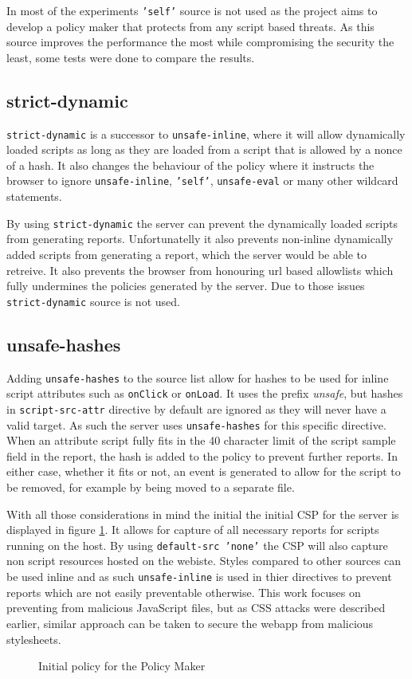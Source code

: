 In most of the experiments \texttt{'self'} source is not used as the project aims to develop a policy maker that protects from any script based threats.
As this source improves the performance the most while compromising the security the least, some tests were done to compare the results.

\subsection{strict-dynamic}

\texttt{strict-dynamic} is a successor to \texttt{unsafe-inline}, where it will allow dynamically loaded scripts as long as they are loaded from a script that is allowed by a nonce of a hash.
It also changes the behaviour of the policy where it instructs the browser to ignore \texttt{unsafe-inline}, \texttt{'self'}, \texttt{unsafe-eval} or many other wildcard statements.

By using \texttt{strict-dynamic} the server can prevent the dynamically loaded scripts from generating reports.
Unfortunatelly it also prevents non-inline dynamically added scripts from generating a report, which the server would be able to retreive.
It also prevents the browser from honouring url based allowlists which fully undermines the policies generated by the server.
Due to those issues \texttt{strict-dynamic} source is not used.

\subsection{unsafe-hashes}

Adding \texttt{unsafe-hashes} to the source list allow for hashes to be used for inline script attributes such as \texttt{onClick} or \texttt{onLoad}.
It uses the prefix {\it unsafe}, but hashes in \texttt{script-src-attr} directive by default are ignored as they will never have a valid target.
As such the server uses \texttt{unsafe-hashes} for this specific directive. 
When an attribute script fully fits in the 40 character limit of the script sample field in the report, the hash is added to the policy to prevent further reports.
In either case, whether it fits or not, an event is generated to allow for the script to be removed, for example by being moved to a separate file.

\vspace{10pt}

With all those considerations in mind the initial the initial CSP for the server is displayed in figure \ref{code:initial}.
It allows for capture of all necessary reports for scripts running on the host.
By using \texttt{default-src 'none'} the CSP will also capture non script resources hosted on the webiste.
Styles compared to other sources can be used inline and as such \texttt{unsafe-inline} is used in thier directives to prevent reports which are not easily preventable otherwise.
This work focuses on preventing from malicious JavaScript files, but as CSS attacks were described earlier, similar approach can be taken to secure the webapp from malicious stylesheets.


\begin{figure}[h]

\caption{Initial policy for the Policy Maker}
	\label{code:initial}
\end{figure}
